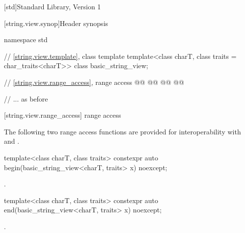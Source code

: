
\setcounter{chapter}{19}
[std]{Standard Library, Version 1}
\setcounter{SectionDepthBase}{1}
\setcounter{section}{6}
\setcounter{subsection}{4}


[string.view.synop]{Header  synopsis}


%
\begin{codeblock}
namespace std {
  // \ref{string.view.template}, class template 
  template<class charT, class traits = char_traits<charT>>
  class basic_string_view;

  // \ref{string.view.range_access},  range access
  @@
    @@
  @@
    @@

  // ... as before
}
\end{codeblock}


\begin{addedblock}
\setcounter{subsubsection}{2}
[string.view.range_access]{ range access}

\pnum
\enternote The following two range access functions are provided for interoperability with
 and .\exitnote

%
\begin{itemdecl}
template<class charT, class traits>
  constexpr auto begin(basic_string_view<charT, traits> x) noexcept;
\end{itemdecl}

\begin{itemdescr}
\pnum
\returns {}.
\end{itemdescr}

%
\begin{itemdecl}
template<class charT, class traits>
  constexpr auto end(basic_string_view<charT, traits> x) noexcept;
\end{itemdecl}

\begin{itemdescr}
\pnum
\returns {}.
\end{itemdescr}
\end{addedblock}

